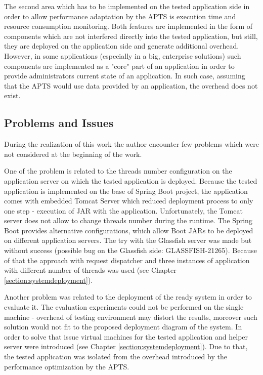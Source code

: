 \documentclass[12pt,a4paper]{article}
\begin{document}
The second area which has to be implemented on the tested application side in order to allow performance adaptation by the APTS is execution time and resource consumption monitoring. Both features are implemented in the form of components which are not interfered directly into the tested application, but still, they are deployed on the application side and generate additional overhead. However, in some applications (especially in a big, enterprise solutions) such components are implemented as a "core" part of an application in order to provide administrators current state of an application. In such case, assuming that the APTS would use data provided by an application, the overhead does not exist. 



\subsection{Problems and Issues}

During the realization of this work the author encounter few problems which were not considered at the beginning of the work.

One of the problem is related to the threads number configuration on the application server on which the tested application is deployed. Because the tested application is implemented on the base of Spring Boot project, the application comes with embedded Tomcat Server which reduced deployment process to only one step - execution of JAR with the application. Unfortunately, the Tomcat server does not allow to change threads number during the runtime. The Spring Boot provides alternative configurations, which allow Boot JARs to be deployed on different application servers. The try with the Glassfish server was made but without success (possible bug on the Glassfish side: GLASSFISH-21265).  Because of that the approach with request dispatcher and three instances of application with different number of threads was used (see Chapter \ref{section:systemdeployment}). 

Another problem was related to the deployment of the ready system in order to evaluate it. The evaluation experiments could not be performed on the single machine - overhead of testing environment may distort the results, moreover such solution would not fit to the proposed deployment diagram of the system. In order to solve that issue virtual machines for the tested application and helper server were introduced (see Chapter \ref{section:systemdeployment}). Due to that, the tested application was isolated from the overhead introduced by the performance optimization by the APTS. 
\end{document}
